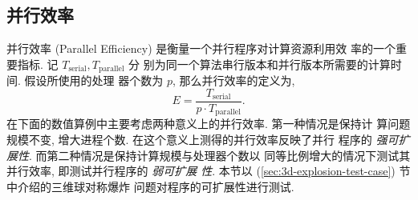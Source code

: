 \subsection{并行效率}
\label{sec:parallel-efficiency}

并行效率 (Parallel Efficiency) 是衡量一个并行程序对计算资源利用效
率的一个重要指标. 记 $T_{\mbox{serial}}, T_{{\mbox{parallel}}}$ 分
别为同一个算法串行版本和并行版本所需要的计算时间. 假设所使用的处理
器个数为 $p$, 那么并行效率的定义为,
\begin{equation}
  \label{eq:def-parallel-efficiency}
  E = \frac{T_{{\mbox{serial}}}}{p \cdot T_{\mbox{parallel}}}.
\end{equation}
在下面的数值算例中主要考虑两种意义上的并行效率. 第一种情况是保持计
算问题规模不变, 增大进程个数. 在这个意义上测得的并行效率反映了并行
程序的 {\it 强可扩展性}. 而第二种情况是保持计算规模与处理器个数以
同等比例增大的情况下测试其并行效率, 即测试并行程序的 {\it 弱可扩展
  性}. 本节以 (\ref{sec:3d-explosion-test-case}) 节中介绍的三维球对称爆炸
问题对程序的可扩展性进行测试.

